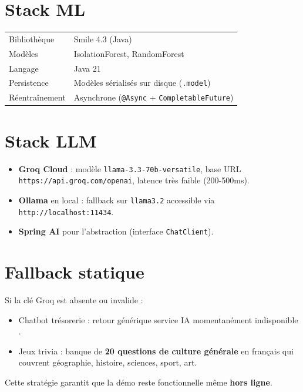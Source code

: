 \documentclass[11pt,a4paper]{report}
\begin{document}
\section{Stack ML}

\begin{tabular}{ll}
\toprule
Bibliothèque  & Smile 4.3 (Java) \\
Modèles       & IsolationForest, RandomForest \\
Langage       & Java 21 \\
Persistence   & Modèles sérialisés sur disque (\texttt{.model}) \\
Réentraînement& Asynchrone (\texttt{@Async} + \texttt{CompletableFuture}) \\
\bottomrule
\end{tabular}

\section{Stack LLM}

\begin{itemize}
  \item \textbf{Groq Cloud} : modèle \texttt{llama-3.3-70b-versatile}, base URL
        \texttt{https://api.groq.com/openai}, latence très faible (200-500ms).
  \item \textbf{Ollama} en local : fallback sur \texttt{llama3.2} accessible via
        \texttt{http://localhost:11434}.
  \item \textbf{Spring AI} pour l'abstraction (interface \texttt{ChatClient}).
\end{itemize}

\section{Fallback statique}

Si la clé Groq est absente ou invalide :
\begin{itemize}
  \item Chatbot trésorerie : retour générique \og service IA momentanément
        indisponible \fg.
  \item Jeux trivia : banque de \textbf{20 questions de culture générale} en
        français qui couvrent géographie, histoire, sciences, sport, art.
\end{itemize}

Cette stratégie garantit que la démo reste fonctionnelle même \textbf{hors
ligne}.


\end{document}
